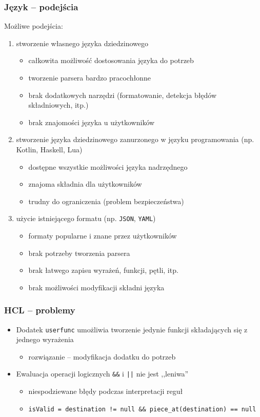 \documentclass{beamer}
\newcommand\pro{\item[$+$]}
\newcommand\con{\item[$-$]}
\begin{document}
\begin{frame}
	\frametitle{Język -- podejścia}
	Możliwe podejścia:
	\begin{enumerate}
		\item stworzenie własnego języka dziedzinowego
		      \begin{itemize}
			      \pro całkowita możliwość dostosowania języka do potrzeb
			      \con tworzenie parsera bardzo pracochłonne
			      \con brak dodatkowych narzędzi (formatowanie, detekcja błędów składniowych, itp.)
			      \con brak znajomości języka u użytkowników
		      \end{itemize}
		\item stworzenie języka dziedzinowego zanurzonego w języku programowania (np. Kotlin, Haskell, Lua)
		      \begin{itemize}
			      \pro dostępne wszystkie możliwości języka nadrzędnego
			      \pro znajoma składnia dla użytkowników
			      \con trudny do ograniczenia (problem bezpieczeństwa)
		      \end{itemize}
		      \framebreak
		\item użycie istniejącego formatu (np. {\tt JSON}, {\tt YAML})
		      \begin{itemize}
			      \pro formaty popularne i znane przez użytkowników
			      \pro brak potrzeby tworzenia parsera
			      \con brak łatwego zapisu wyrażeń, funkcji, pętli, itp.
			      \con brak możliwości modyfikacji składni języka
		      \end{itemize}
	\end{enumerate}
\end{frame}

\begin{frame}[noframenumbering]
	\frametitle{HCL -- problemy}
	\begin{itemize}
		\item Dodatek {\tt userfunc} umożliwia tworzenie jedynie funkcji składających się z jednego wyrażenia
		      \begin{itemize}
			      \item rozwiązanie -- modyfikacja dodatku do potrzeb
		      \end{itemize}
		\item Ewaluacja operacji logicznych {\tt \&\&} i {\tt ||} nie jest ,,leniwa''
		      \begin{itemize}
			      \item niespodziewane błędy podczas interpretacji reguł
			      \item \lstinline|isValid = destination != null && piece_at(destination) == null|
		      \end{itemize}
	\end{itemize}
\end{frame}
\end{document}
